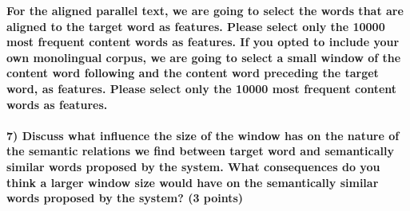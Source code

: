 \documentclass[11pt]{article}
\begin{document}
    \textbf{For the aligned parallel text, we are going to select the words
that are aligned to the target word as features. Please select only the
10000 most frequent content words as features. If you opted to include
your own monolingual corpus, we are going to select a small window of
the content word following and the content word preceding the target
word, as features. Please select only the 10000 most frequent content
words as features.}

    \hypertarget{discuss-what-influence-the-size-of-the-window-has-on-the-nature-of-the-semantic-relations-we-find-between-target-word-and-semantically-similar-words-proposed-by-the-system.-what-consequences-do-you-think-a-larger-window-size-would-have-on-the-semantically-similar-words-proposed-by-the-system-3-points}{%
\paragraph{7) Discuss what influence the size of the window has on the
nature of the semantic relations we find between target word and
semantically similar words proposed by the system. What consequences do
you think a larger window size would have on the semantically similar
words proposed by the system? (3
points)}\label{discuss-what-influence-the-size-of-the-window-has-on-the-nature-of-the-semantic-relations-we-find-between-target-word-and-semantically-similar-words-proposed-by-the-system.-what-consequences-do-you-think-a-larger-window-size-would-have-on-the-semantically-similar-words-proposed-by-the-system-3-points}}
\end{document}
